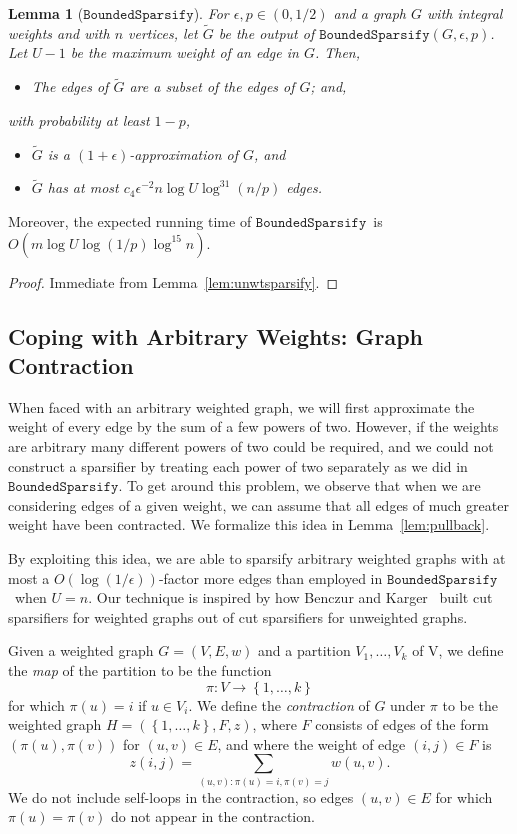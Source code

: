 \documentclass[11pt]{article}
\newtheorem{lemma}[theorem]{Lemma}
\newcommand{\boundedsparsify}{\ensuremath{\mathtt{BoundedSparsify}}}
\def\Gtil{\widetilde{G}}
\def\setof#1{\left\{#1  \right\}}
\def\setof#1{\left\{#1  \right\}}
\begin{document}
\begin{lemma}[\boundedsparsify]\label{lem:boundedsparsify}
For $\epsilon , p \in (0,1/2)$ and a graph $G$ with integral weights
  and with $n$ vertices, let
$\Gtil$ be the output of $\boundedsparsify (G, \epsilon , p)$.
Let $U-1$ be the maximum weight of an edge in $G$.
Then,
\begin{itemize}
\item [(B.1)] The edges of $\Gtil$ are a subset of the edges of $G$; and,
\end{itemize}
with probability at least $1-p$,
\begin{itemize}
\item [(B.2)] $\Gtil$ is a $(1+\epsilon)$-approximation of $G$, and
\item [(B.3)] $\Gtil$ has at most $c_{4}\epsilon^{{-2}} n \log U \log^{31} (n/p)$
  edges.
\end{itemize}
\end{lemma}
Moreover, the expected running time of \boundedsparsify  \ is 
  $O \left(m \log U \log (1/p) \log^{15} n \right) $.
\begin{proof}
Immediate from Lemma~\ref{lem:unwtsparsify}.
\end{proof}


\subsection{Coping with Arbitrary Weights: Graph Contraction}\label{}

When faced with an arbitrary weighted graph, we will
  first approximate the weight of every edge by the sum of a
  few powers of two.
However, if the weights are arbitrary many different powers
  of two could be required, and we could not construct a sparsifier
  by treating each power of two separately as we did in
  \boundedsparsify .
To get around this problem, we observe that when we are considering
  edges of a given weight, we can assume that all edges of much greater
  weight have been contracted.
We formalize this idea in Lemma~\ref{lem:pullback}.

By exploiting this idea, we are able to
  sparsify arbitrary weighted graphs with at most a $O (\log (1/\epsilon))$-factor
  more edges than employed in \boundedsparsify \ when $U = n$.
Our technique is inspired by how Benczur and Karger~\cite{BenczurKarger}
  built cut sparsifiers for weighted graphs out of
  cut sparsifiers for unweighted graphs.


Given a weighted graph $G = (V, E, w)$ and a partition $V_{1}, \dotsc , V_{k}$ of V,
  we define the \textit{map} of the partition to be the function
\[
 \pi : V \rightarrow \setof{1,\dotsc ,k}
\]
for which $\pi (u) = i$ if $u \in V_{i}$.
We define the \textit{contraction} of $G$ under $\pi$ to be the weighted graph
  $H = (\setof{1,\dotsc ,k}, F, z)$, where $F$ consists of edges of the form
  $(\pi (u), \pi (v))$ for $(u,v) \in E$, and where the weight of edge
  $(i,j) \in F$ is
\[
z (i,j) =   \sum_{(u,v) : \pi (u) = i, \pi (v) = j} w (u,v).
\]
We do not include self-loops in the contraction, so
  edges $(u,v) \in E$ for which $\pi (u) = \pi (v)$ do not appear in the contraction.
\end{document}
